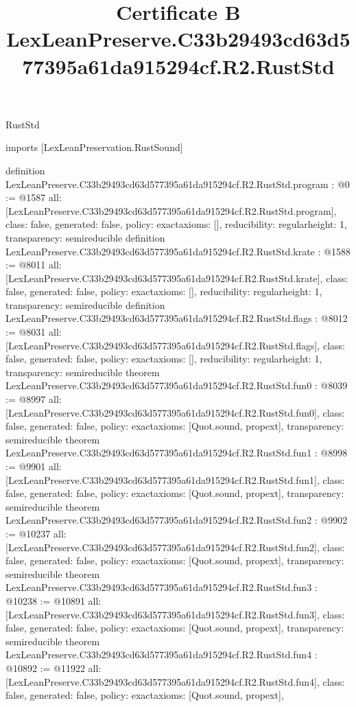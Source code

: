 \begin{lexlean}{RustStd}
\title{Certificate B LexLeanPreserve.C33b29493cd63d577395a61da915294cf.R2.RustStd}
\begin{coremodule}
imports [LexLeanPreservation.RustSound]

definition LexLeanPreserve.C33b29493cd63d577395a61da915294cf.R2.RustStd.program : @0 := @1587 {
  all: [LexLeanPreserve.C33b29493cd63d577395a61da915294cf.R2.RustStd.program],
  class: false,
  generated: false,
  policy: exact{axioms: []},
  reducibility: regular{height: 1},
  transparency: semireducible
}
definition LexLeanPreserve.C33b29493cd63d577395a61da915294cf.R2.RustStd.krate : @1588 := @8011 {
  all: [LexLeanPreserve.C33b29493cd63d577395a61da915294cf.R2.RustStd.krate],
  class: false,
  generated: false,
  policy: exact{axioms: []},
  reducibility: regular{height: 1},
  transparency: semireducible
}
definition LexLeanPreserve.C33b29493cd63d577395a61da915294cf.R2.RustStd.flags : @8012 := @8031 {
  all: [LexLeanPreserve.C33b29493cd63d577395a61da915294cf.R2.RustStd.flags],
  class: false,
  generated: false,
  policy: exact{axioms: []},
  reducibility: regular{height: 1},
  transparency: semireducible
}
theorem LexLeanPreserve.C33b29493cd63d577395a61da915294cf.R2.RustStd.fun0 : @8039 := @8997 {
  all: [LexLeanPreserve.C33b29493cd63d577395a61da915294cf.R2.RustStd.fun0],
  class: false,
  generated: false,
  policy: exact{axioms: [Quot.sound, propext]},
  transparency: semireducible
}
theorem LexLeanPreserve.C33b29493cd63d577395a61da915294cf.R2.RustStd.fun1 : @8998 := @9901 {
  all: [LexLeanPreserve.C33b29493cd63d577395a61da915294cf.R2.RustStd.fun1],
  class: false,
  generated: false,
  policy: exact{axioms: [Quot.sound, propext]},
  transparency: semireducible
}
theorem LexLeanPreserve.C33b29493cd63d577395a61da915294cf.R2.RustStd.fun2 : @9902 := @10237 {
  all: [LexLeanPreserve.C33b29493cd63d577395a61da915294cf.R2.RustStd.fun2],
  class: false,
  generated: false,
  policy: exact{axioms: [Quot.sound, propext]},
  transparency: semireducible
}
theorem LexLeanPreserve.C33b29493cd63d577395a61da915294cf.R2.RustStd.fun3 : @10238 := @10891 {
  all: [LexLeanPreserve.C33b29493cd63d577395a61da915294cf.R2.RustStd.fun3],
  class: false,
  generated: false,
  policy: exact{axioms: [Quot.sound, propext]},
  transparency: semireducible
}
theorem LexLeanPreserve.C33b29493cd63d577395a61da915294cf.R2.RustStd.fun4 : @10892 := @11922 {
  all: [LexLeanPreserve.C33b29493cd63d577395a61da915294cf.R2.RustStd.fun4],
  class: false,
  generated: false,
  policy: exact{axioms: [Quot.sound, propext]},
}
\end{coremodule}
\end{lexlean}
